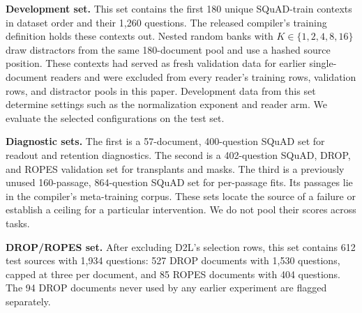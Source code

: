\textbf{Development set.} This set contains the first 180 unique SQuAD-train
contexts in dataset order and their 1,260 questions. The released compiler's training
definition holds these contexts out. Nested random banks with
$K\in\{1,2,4,8,16\}$ draw distractors from the same 180-document pool and use a
hashed source position. These contexts had served as fresh
validation data for earlier single-document readers and were excluded from every
reader's training rows, validation rows, and distractor pools in this paper.
Development data from this set determine settings such as the normalization exponent
and reader arm. We evaluate the selected configurations on the test set.

\textbf{Diagnostic sets.} The first is a 57-document, 400-question SQuAD set for
readout and retention diagnostics. The second is a 402-question SQuAD, DROP, and
ROPES validation set for transplants and masks. The third is a previously unused
160-passage, 864-question SQuAD set for per-passage fits. Its passages lie in the
compiler's meta-training corpus. These sets locate the source of a failure or establish a
ceiling for a particular intervention. We do not pool their scores across tasks.

\textbf{DROP/ROPES set.} After excluding D2L's selection rows, this set contains
612 test sources with 1,934 questions: 527 DROP documents with 1,530 questions,
capped at three per document, and 85 ROPES documents with 404 questions. The
94 DROP documents never used by any earlier experiment are flagged separately.

